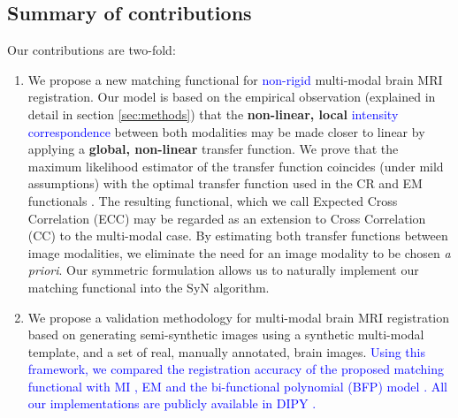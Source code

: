 \subsection{Summary of contributions}
Our contributions are two-fold:
\begin{enumerate}
\item{We propose a new matching functional for \textcolor{blue}{non-rigid} multi-modal brain MRI registration. Our model is based on the empirical observation (explained in detail in section \ref{sec:methods}) that the \textbf{non-linear, local} \textcolor{blue}{intensity correspondence} between both modalities may be made closer to linear by applying a \textbf{global, non-linear} transfer function. We prove that the maximum likelihood estimator of the transfer function coincides (under mild assumptions) with the optimal transfer function used in the CR and EM functionals \cite{Roche1998, Arce-santana2014, Ocegueda2015}. The resulting functional, which we call Expected Cross Correlation (ECC) may be regarded as an extension to Cross Correlation (CC) to the multi-modal case. By estimating both transfer functions between image modalities, we eliminate the need for an image modality to be chosen {\it a priori}. Our symmetric formulation allows us to naturally implement our matching functional into the SyN \cite{Avants2011a} algorithm.}
\item{We propose a validation methodology for multi-modal brain MRI registration based on generating semi-synthetic images using a synthetic multi-modal template, and a set of real, manually annotated, brain images. \textcolor{blue}{ Using this framework, we compared the registration accuracy of the proposed matching functional with MI \cite{Mattes2003}, EM \cite{Arce-santana2014} and the bi-functional polynomial (BFP) model \cite{Guimond2001}. All our implementations are publicly available in DIPY \cite{Garyfallidis2014}.}}
\end{enumerate}
